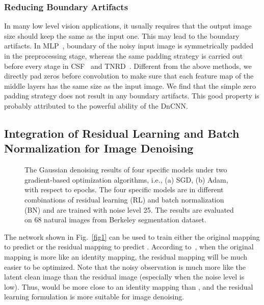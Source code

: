 \documentclass[journal]{IEEEtran}
\begin{document}
\subsubsection{Reducing Boundary Artifacts}
In many low level vision  applications, it usually requires that the output image size should keep the same as the input one. This may lead to the boundary artifacts. In MLP~\cite{burger2012image}, boundary of the noisy input image is symmetrically padded in the preprocessing stage, whereas the same padding strategy is carried out before every stage in CSF~\cite{schmidt2014shrinkage} and TNRD~\cite{chen2015trainable}. Different from the above methods, we directly pad zeros before convolution to make sure that each feature map of the middle layers has the same size as the input image. We find that the simple zero padding strategy does not result in any boundary artifacts. This good property is probably attributed to the powerful ability of the DnCNN.






\subsection{Integration of Residual Learning and Batch Normalization for Image Denoising}



\begin{figure*}[!htbp]
  \centering
{}
  \caption{The Gaussian denoising results of four specific models under two gradient-based optimization algorithms, i.e., (a) SGD, (b) Adam, with respect to epochs. The four specific models are in different combinations of residual learning (RL) and batch normalization (BN) and are trained with noise level 25. The results are evaluated on 68 natural images from Berkeley segmentation dataset.}\label{fig_sgd_adam}
\end{figure*}



The network shown in Fig.~\ref{fig1} can be used to train either the original mapping  to predict  or the residual mapping  to predict . According to~\cite{he2015deep}, when the original mapping is more like an identity mapping, the residual mapping will be much easier to be optimized. Note that the noisy observation  is much more like the latent clean image  than the residual image  (especially when the noise level is low). Thus,  would be more close to an identity mapping than , and the residual learning formulation is more suitable for image denoising.
\end{document}
